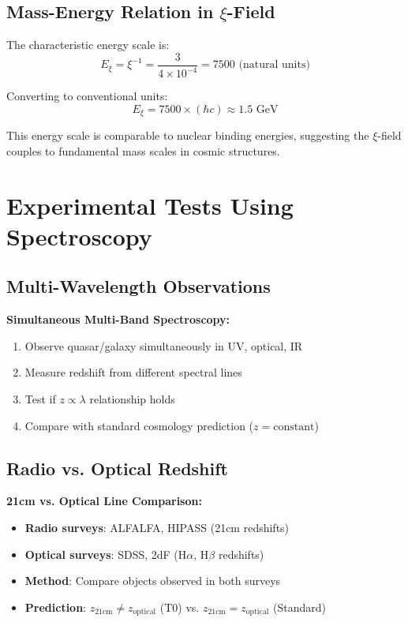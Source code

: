 \documentclass[12pt,a4paper]{article}
\newcommand{\Exi}{E_\xi}
\theoremstyle{definition}
\begin{document}
	\subsection{Mass-Energy Relation in $\xi$-Field}
	
	The characteristic energy scale is:
	\begin{equation}
		\Exi = \xi^{-1} = \frac{3}{4 \times 10^{-4}} = 7500 \text{ (natural units)}
	\end{equation}
	
	Converting to conventional units:
	\begin{equation}
		\Exi = 7500 \times (\hbar c) \approx 1.5 \text{ GeV}
	\end{equation}
	
	This energy scale is comparable to nuclear binding energies, suggesting the $\xi$-field couples to fundamental mass scales in cosmic structures.
	
	\section{Experimental Tests Using Spectroscopy}
	
	\subsection{Multi-Wavelength Observations}
	
	\begin{experiment}
		\textbf{Simultaneous Multi-Band Spectroscopy:}
		\begin{enumerate}
			\item Observe quasar/galaxy simultaneously in UV, optical, IR
			\item Measure redshift from different spectral lines
			\item Test if $z \propto \lambda$ relationship holds
			\item Compare with standard cosmology prediction ($z = \text{constant}$)
		\end{enumerate}
	\end{experiment}
	
	\subsection{Radio vs. Optical Redshift}
	
	\begin{experiment}
		\textbf{21cm vs. Optical Line Comparison:}
		\begin{itemize}
			\item \textbf{Radio surveys}: ALFALFA, HIPASS (21cm redshifts)
			\item \textbf{Optical surveys}: SDSS, 2dF (H$\alpha$, H$\beta$ redshifts)
			\item \textbf{Method}: Compare objects observed in both surveys
			\item \textbf{Prediction}: $z_{21\text{cm}} \neq z_{\text{optical}}$ (T0) vs. $z_{21\text{cm}} = z_{\text{optical}}$ (Standard)
		\end{itemize}
	\end{experiment}
	
\end{document}
